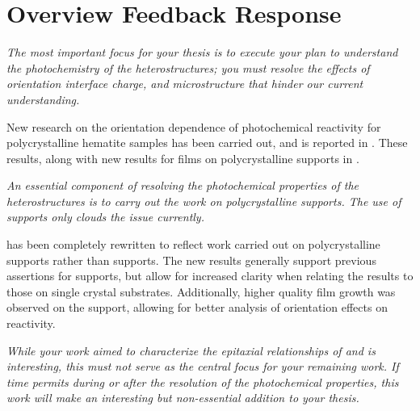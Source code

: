 \documentclass[12pt,%
               letterpaper,
               oneside]{uiothesis}
\begin{document}
  \pagestyle{uio}

\chapter*{Overview Feedback Response}


\begin{enum}
  \item \emph{The most important focus for your thesis is to execute your plan to
understand the photochemistry of the heterostructures; you must resolve the effects of
orientation interface charge, and microstructure that hinder our current
understanding.}\vspace{8pt}
  
	New research on the orientation dependence of photochemical reactivity for
polycrystalline hematite samples has been carried out, and is reported in
. These results, along with new results for films on
polycrystalline  supports in
.\vspace{16pt}
  
  \item \emph{An essential component of resolving the photochemical properties of the
heterostructures is to carry out the work on polycrystalline  supports. The use
of  supports only clouds the issue currently.}\vspace{8pt}
  
   has been completely rewritten to reflect
work carried out on polycrystalline  supports rather than  supports.
The new results generally support previous assertions for  supports, but allow
for increased clarity when relating the results to those on single crystal substrates.
Additionally, higher quality film growth was observed on the  support, allowing
for better analysis of orientation effects on reactivity.\vspace{16pt}
  
  \item \emph{While your work aimed to characterize the epitaxial relationships of
 and  is interesting, this must not serve as the central focus for
your remaining work. If time permits during or after the resolution of the photochemical
properties, this work will make an interesting but non-essential addition to your
thesis.}\vspace{8pt}
  

\end{enum}
\end{document}
